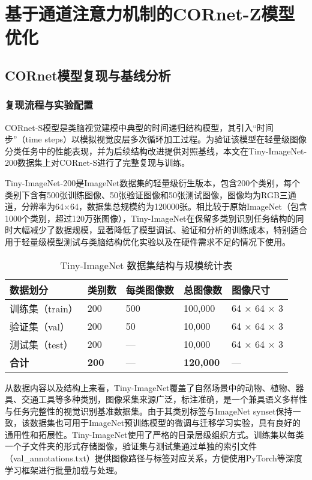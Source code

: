 
\chapter{基于通道注意力机制的CORnet-Z模型优化}

\section{CORnet模型复现与基线分析}

\subsection{复现流程与实验配置}

CORnet-S模型是类脑视觉建模中典型的时间递归结构模型，其引入“时间步”（time steps）以模拟视觉皮层多次循环加工过程。为验证该模型在轻量级图像分类任务中的性能表现，并为后续结构改进提供对照基线，本文在Tiny-ImageNet-200数据集上对CORnet-S进行了完整复现与训练。

Tiny-ImageNet-200是ImageNet数据集的轻量级衍生版本，包含200个类别，每个类别下含有500张训练图像、50张验证图像和50张测试图像，图像均为RGB三通道，分辨率为64×64，数据集总规模约为120000张\cite{le2015tiny}。相比较于原始ImageNet（包含1000个类别，超过120万张图像），Tiny-ImageNet在保留多类别识别任务结构的同时大幅减少了数据规模，显著降低了模型调试、验证和分析的训练成本，特别适合用于轻量级模型测试与类脑结构优化实验以及在硬件需求不足的情况下使用。

\begin{table}[htb]
	\centering
	\caption{Tiny-ImageNet 数据集结构与规模统计表}
	\label{tab:tinyimagenet}
	\begin{tabular}{lllll}
		\hline
		数据划分 & 类别数 & 每类图像数 & 总图像数 & 图像尺寸 \\
		\hline
		训练集（train） & 200 & 500  & 100,000  & 64 × 64 × 3 \\
		验证集（val）   & 200 & 50   & 10,000   & 64 × 64 × 3 \\
		测试集（test）  & 200 & —    & 10,000   & 64 × 64 × 3 \\
		\textbf{合计}   & \textbf{200} & — & \textbf{120,000} & — \\
		\hline
	\end{tabular}
\end{table}

从数据内容以及结构上来看，Tiny-ImageNet覆盖了自然场景中的动物、植物、器具、交通工具等多种类别，图像采集来源广泛，标注准确，是一个兼具语义多样性与任务完整性的视觉识别基准数据集。由于其类别标签与ImageNet synset保持一致，该数据集也可用于ImageNet预训练模型的微调与迁移学习实验，具有良好的通用性和拓展性。Tiny-ImageNet使用了严格的目录层级组织方式。训练集以每类一个子文件夹的形式存储图像，验证集与测试集通过单独的索引文件（val\_annotations.txt）提供图像路径与标签对应关系，方便使用PyTorch等深度学习框架进行批量加载与处理。

